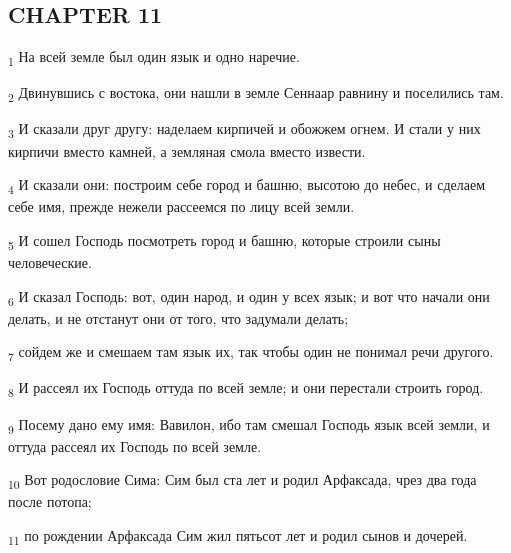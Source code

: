 \subsection{CHAPTER 11}
\begin{tcolorbox}
\textsubscript{1} На всей земле был один язык и одно наречие.
\end{tcolorbox}
\begin{tcolorbox}
\textsubscript{2} Двинувшись с востока, они нашли в земле Сеннаар равнину и поселились там.
\end{tcolorbox}
\begin{tcolorbox}
\textsubscript{3} И сказали друг другу: наделаем кирпичей и обожжем огнем. И стали у них кирпичи вместо камней, а земляная смола вместо извести.
\end{tcolorbox}
\begin{tcolorbox}
\textsubscript{4} И сказали они: построим себе город и башню, высотою до небес, и сделаем себе имя, прежде нежели рассеемся по лицу всей земли.
\end{tcolorbox}
\begin{tcolorbox}
\textsubscript{5} И сошел Господь посмотреть город и башню, которые строили сыны человеческие.
\end{tcolorbox}
\begin{tcolorbox}
\textsubscript{6} И сказал Господь: вот, один народ, и один у всех язык; и вот что начали они делать, и не отстанут они от того, что задумали делать;
\end{tcolorbox}
\begin{tcolorbox}
\textsubscript{7} сойдем же и смешаем там язык их, так чтобы один не понимал речи другого.
\end{tcolorbox}
\begin{tcolorbox}
\textsubscript{8} И рассеял их Господь оттуда по всей земле; и они перестали строить город.
\end{tcolorbox}
\begin{tcolorbox}
\textsubscript{9} Посему дано ему имя: Вавилон, ибо там смешал Господь язык всей земли, и оттуда рассеял их Господь по всей земле.
\end{tcolorbox}
\begin{tcolorbox}
\textsubscript{10} Вот родословие Сима: Сим был ста лет и родил Арфаксада, чрез два года после потопа;
\end{tcolorbox}
\begin{tcolorbox}
\textsubscript{11} по рождении Арфаксада Сим жил пятьсот лет и родил сынов и дочерей.
\end{tcolorbox}
